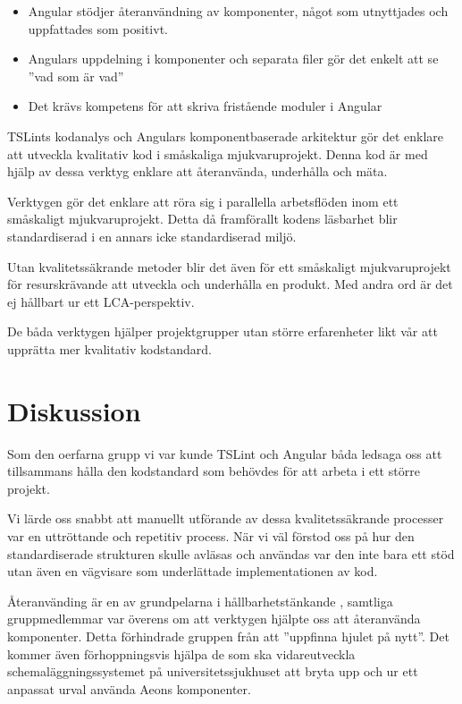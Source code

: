 \begin{itemize}
	\item Angular stödjer återanvändning av komponenter, något som utnyttjades och uppfattades som positivt.
	\item Angulars uppdelning i komponenter och separata filer gör det enkelt att se ''vad som är vad''
	\item Det krävs kompetens för att skriva fristående moduler i Angular
\end{itemize}

TSLints kodanalys och Angulars komponentbaserade arkitektur gör det enklare att utveckla kvalitativ kod i småskaliga mjukvaruprojekt. Denna kod är med hjälp av dessa verktyg enklare att återanvända, underhålla och mäta.

Verktygen gör det enklare att röra sig i parallella arbetsflöden inom ett småskaligt mjukvaruprojekt. Detta då framförallt kodens läsbarhet blir standardiserad i en annars icke standardiserad miljö.

Utan kvalitetssäkrande metoder blir det även för ett småskaligt mjukvaruprojekt för resurskrävande att utveckla och underhålla en produkt. Med andra ord är det ej hållbart ur ett LCA-perspektiv.

De båda verktygen hjälper projektgrupper utan större erfarenheter likt vår att upprätta mer kvalitativ kodstandard.

\section{Diskussion}

Som den oerfarna  grupp vi var kunde TSLint och Angular båda ledsaga oss att tillsammans hålla den kodstandard som behövdes för att arbeta i ett större projekt.

Vi lärde oss snabbt att manuellt utförande av dessa kvalitetssäkrande processer var en uttröttande och repetitiv process. När vi väl förstod oss på hur den standardiserade strukturen skulle avläsas och användas var den inte bara ett stöd utan även en vägvisare som underlättade implementationen av kod.

Återanvänding är en av grundpelarna i hållbarhetstänkande \cite{sustainable}, samtliga gruppmedlemmar var överens om att verktygen hjälpte oss att återanvända komponenter. Detta förhindrade gruppen från att ''uppfinna hjulet på nytt''. Det kommer även förhoppningsvis hjälpa de som ska vidareutveckla schemaläggningssystemet på universitetssjukhuset att bryta upp och ur ett anpassat urval använda Aeons komponenter.


